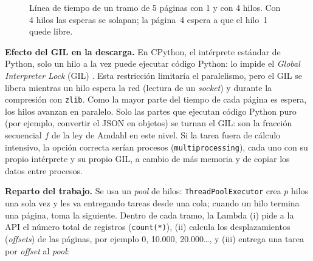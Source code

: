 \documentclass[conference]{IEEEtran}
\begin{document}
\begin{figure}[htbp]
\centering
{}
\caption{Línea de tiempo de un tramo de 5 páginas con 1 y con 4 hilos. Con 4 hilos las esperas se solapan; la página~4 espera a que el hilo~1 quede libre.}
\label{fig:hilos}
\end{figure}

\textbf{Efecto del GIL en la descarga.} En CPython, el intérprete estándar de Python, solo un hilo a la vez puede ejecutar código Python: lo impide el \textit{Global Interpreter Lock} (GIL) \cite{python_threading}. Esta restricción limitaría el paralelismo, pero el GIL se libera mientras un hilo espera la red (lectura de un \textit{socket}) y durante la compresión con \texttt{zlib}. Como la mayor parte del tiempo de cada página es espera, los hilos avanzan en paralelo. Solo las partes que ejecutan código Python puro (por ejemplo, convertir el JSON en objetos) se turnan el GIL: son la fracción secuencial $f$ de la ley de Amdahl en este nivel. Si la tarea fuera de cálculo intensivo, la opción correcta serían procesos (\texttt{multiprocessing}), cada uno con su propio intérprete y su propio GIL, a cambio de más memoria y de copiar los datos entre procesos.

\textbf{Reparto del trabajo.} Se usa un \emph{pool} de hilos: \texttt{ThreadPoolExecutor} crea $p$ hilos una sola vez y les va entregando tareas desde una cola; cuando un hilo termina una página, toma la siguiente. Dentro de cada tramo, la Lambda (i) pide a la API el número total de registros (\texttt{count(*)}), (ii) calcula los desplazamientos (\textit{offsets}) de las páginas, por ejemplo 0, 10.000, 20.000\ldots, y (iii) entrega una tarea por \textit{offset} al \emph{pool}:
\end{document}
